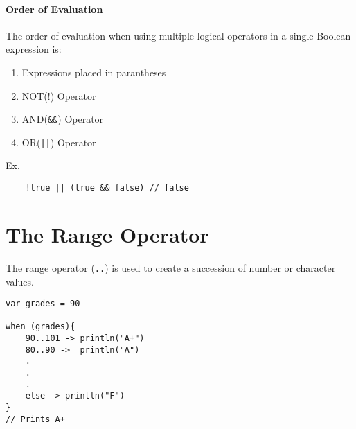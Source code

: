 \paragraph{Order of Evaluation}
The order of evaluation when using multiple logical operators in a single Boolean expression is:
\begin{enumerate}
    \item Expressions placed in parantheses
    \item NOT(!) Operator
    \item AND(\verb!&&!) Operator
    \item OR(\verb!||!) Operator
\end{enumerate}
Ex. 
\begin{verbatim}
    !true || (true && false) // false
\end{verbatim}

\section{The Range Operator}
The range operator (\verb!..!) is used to create a succession of number or character values.
\begin{verbatim}
var grades = 90

when (grades){
    90..101 -> println("A+")
    80..90 ->  println("A")
    .
    .
    .
    else -> println("F")
}
// Prints A+ 
\end{verbatim}